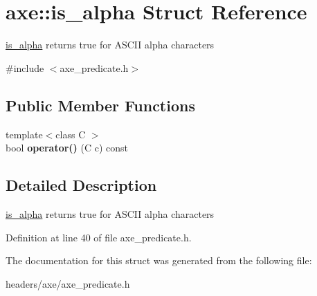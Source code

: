 \hypertarget{structaxe_1_1is__alpha}{\section{axe\+:\+:is\+\_\+alpha Struct Reference}
\label{structaxe_1_1is__alpha}
}


\hyperlink{structaxe_1_1is__alpha}{is\+\_\+alpha} returns true for A\+S\+C\+I\+I alpha characters  




{\ttfamily \#include $<$axe\+\_\+predicate.\+h$>$}

\subsection*{Public Member Functions}
\begin{DoxyCompactItemize}
\item 
\hypertarget{structaxe_1_1is__alpha_aed430ff97aac6e93b8dfb10ab15b749d}{{\footnotesize template$<$class C $>$ }\\bool {\bfseries operator()} (C c) const }\label{structaxe_1_1is__alpha_aed430ff97aac6e93b8dfb10ab15b749d}

\end{DoxyCompactItemize}


\subsection{Detailed Description}
\hyperlink{structaxe_1_1is__alpha}{is\+\_\+alpha} returns true for A\+S\+C\+I\+I alpha characters 

Definition at line 40 of file axe\+\_\+predicate.\+h.



The documentation for this struct was generated from the following file\+:\begin{DoxyCompactItemize}
\item 
headers/axe/axe\+\_\+predicate.\+h\end{DoxyCompactItemize}
